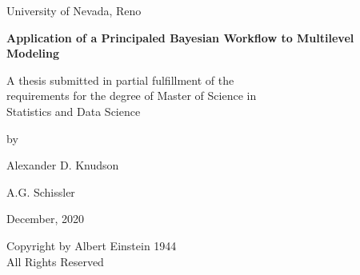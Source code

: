 \documentclass[11pt, oneside, openany]{scrbook}
\begin{document}
\begin{titlepage}
\begin{center}
\vspace*{1in}
University of Nevada, Reno

\vspace{1.5in}
\textbf{Application of a Principaled Bayesian Workflow to Multilevel Modeling}

\vspace{1in}
A thesis submitted in partial fulfillment of the \\
requirements for the degree of Master of Science in \\
Statistics and Data Science

\vspace{1in}
by

\vspace{1em}
Alexander D. Knudson

\vspace{2em}
A.G. Schissler

\vspace{3em}
December, 2020

\end{center}
\end{titlepage}
\thispagestyle{empty}
\begin{center}
\vspace*{\fill}
Copyright by Albert Einstein 1944 \\
All Rights Reserved
\vspace*{\fill}
\end{center}
\end{document}
